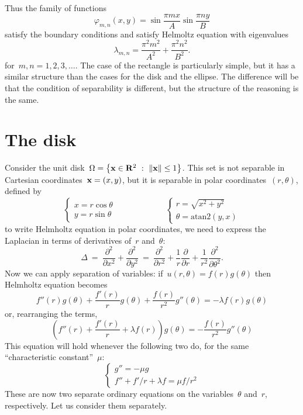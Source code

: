 Thus the family of functions
\[
	\varphi_{m,n}(x,y)=\sin\frac{\pi m x}A\sin\frac{\pi n y}B
\]
satisfy the boundary conditions and satisfy Helmoltz equation with
eigenvalues
\[
	\lambda_{m,n} =
	\frac{\pi^2m^2}{A^2}
	+
	\frac{\pi^2n^2}{B^2}.
\]
for~$m,n=1,2,3,\ldots$.
The case of the rectangle is particularly simple, but it has a
similar
structure than the cases for the disk and the ellipse.
The difference will be that the condition of separability is
different, but the structure of the reasoning is the same.



\clearpage
\section{The disk}

Consider the unit disk~$\Omega=\left\{\mathbf{x}\in\mathbf{R}^2\ :\
\|\mathbf{x}\|\le1\right\}$.  This set is not separable in Cartesian
coordinates~$\mathbf{x}=(x,y)$, but it is separable in polar
coordinates~$(r,\theta)$, defined by
\[
	\begin{cases}
		x = r\cos\theta \\
		y = r\sin\theta
	\end{cases}
	\qquad\qquad
	\qquad
	\begin{cases}
		r = \sqrt{x^2+y^2} \\
		\theta = \mathrm{atan2}(y,x)
	\end{cases}
\]
to write Helmholtz equation in polar coordinates, we need to
express the Laplacian in terms of derivatives of~$r$ and~$\theta$:
\[
	\Delta
	\ = \ %
	\frac{\partial^2}{\partial x^2}
	+
	\frac{\partial^2}{\partial y^2}
	\ = \ %
	\frac{\partial^2}{\partial r^2}
	+
	\frac 1r
	\frac{\partial}{\partial r}
	+
	\frac 1{r^2}
	\frac{\partial^2}{\partial \theta^2}.
\]
Now we can apply separation of variables:
if~$u(r,\theta)=f(r)g(\theta)$ then Helmholtz equation becomes
\[%
f''(r)g(\theta)+\frac{f'(r)}rg(\theta)+\frac{f(r)}{r^2}g''(\theta)
=-\lambda f(r)g(\theta)
\]
or, rearranging the terms,
\[
	\left(
f''(r)
+
\frac{f'(r)}r
+\lambda f(r)
\right)g(\theta)
=
-
\frac{f(r)}{r^2}g''(\theta)
\]
This equation will hold whenever the following two do, for the same
``characteristic constant''~$\mu$:
\[
	\begin{cases}
		g''=-\mu g \\
		f''+{f'}/{r}+\lambda f = \mu{f}/{r^2}
	\end{cases}
\]
These are now two separate ordinary equations on the
variables~$\theta$ and~$r$, respectively.  Let us consider them
separately.

